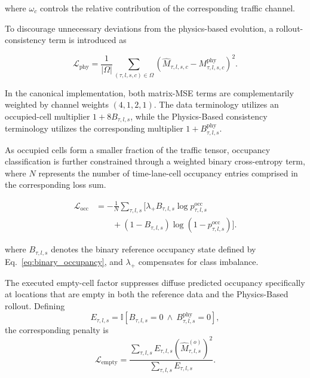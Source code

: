 \documentclass[journal]{IEEEtran}
\begin{document}
where $\omega_c$ controls the relative contribution of the corresponding traffic channel.

To discourage unnecessary deviations from the physics-based evolution, a rollout-consistency term is introduced as

\begin{equation}
\mathcal{L}_{\mathrm{phy}}
=
\frac{1}{|\Omega|}
\sum_{(\tau,l,s,c)\in\Omega}
\left(
\widehat{M}_{\tau,l,s,c}
-
M_{\tau,l,s,c}^{\mathrm{phy}}
\right)^2.
\end{equation}

In the canonical implementation, both matrix-MSE terms are complementarily weighted by channel weights $(4,1,2,1)$. The data terminology utilizes an occupied-cell multiplier $1+8B_{\tau,l,s}$, while the Physics-Based consistency terminology utilizes the corresponding multiplier $1+B_{\tau,l,s}^{\mathrm{phy}}$.

As occupied cells form a smaller fraction of the traffic tensor, occupancy classification is further constrained through a weighted binary cross-entropy term, where $N$ represents the number of time-lane-cell occupancy entries comprised in the corresponding loss sum.

\begin{equation}
\begin{aligned}
\mathcal{L}_{\mathrm{occ}}
&=
-
\frac{1}{N}
\sum_{\tau,l,s}
\Bigg[
\lambda_{+}
B_{\tau,l,s}
\log
p_{\tau,l,s}^{\mathrm{occ}}
\\
&\qquad+
\left(
1-B_{\tau,l,s}
\right)
\log
\left(
1-p_{\tau,l,s}^{\mathrm{occ}}
\right)
\Bigg].
\end{aligned}
\end{equation}

where $B_{\tau,l,s}$ denotes the binary reference occupancy state defined by
Eq.~\eqref{eq:binary_occupancy}, and $\lambda_{+}$ compensates for class imbalance.


The executed empty-cell factor suppresses diffuse predicted occupancy specifically at locations that are empty in both the reference data and the Physics-Based rollout. Defining
\begin{equation}
E_{\tau,l,s}
=
\mathbb{I}\left[
B_{\tau,l,s}=0
\ \land\
B_{\tau,l,s}^{\mathrm{phy}}=0
\right],
\end{equation}
the corresponding penalty is
\begin{equation}
\mathcal{L}_{\mathrm{empty}}
=
\frac{
\sum_{\tau,l,s}
E_{\tau,l,s}
\left(
\widehat{M}_{\tau,l,s}^{(o)}
\right)^2
}{
\sum_{\tau,l,s}E_{\tau,l,s}
}.
\end{equation}
\end{document}
